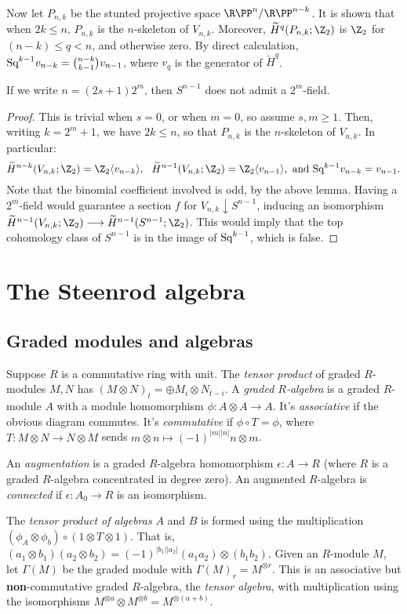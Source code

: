 \documentclass[11pt]{article}
\begin{document}
Now let $P_{n,k}$ be the stunted projective space $\RP^n/\RP^{n-k}$. It is shown that when $2k\leq n$, $P_{n,k}$ is the $n$-skeleton of $V_{n,k}$. Moreover, $\widetilde H^q(P_{n,k};\Z_2)$ is $\Z_2$ for $(n-k)\leq q<n$, and otherwise zero. By direct calculation, $\textup{Sq}^{k-1}v_{n-k}=\binom{n-k}{k-1}v_{n-1}$, where $v_q$ is the generator of $\widetilde H^q$.
\begin{thm*}
If we write $n=(2s+1)2^m$, then $S^{n-1}$ does not admit a $2^m$-field.
\end{thm*}
\begin{proof}
This is trivial when $s=0$, or when $m=0$, so assume $s,m\geq1$. Then, writing $k=2^m+1$, we have $2k\leq n$, so that $P_{n,k}$ is the $n$-skeleton of $V_{n,k}$. In particular: \[\widetilde H^{n-k}(V_{n,k};\Z_2)=\Z_2\langle v_{n-k}\rangle,\ \ \widetilde H^{n-1}(V_{n,k};\Z_2)=\Z_2\langle v_{n-1}\rangle,\text{ and }\Squ^{k-1}v_{n-k}=v_{n-1}.\]
Note that the binomial coefficient involved is odd, by the above lemma.
Having a $2^m$-field would guarantee a section $f$ for $V_{n,k}\downarrow S^{n-1}$, inducing an  isomorphism $\widetilde H^{n-1}(V_{n,k};\Z_2)\to\widetilde H^{n-1}(S^{n-1};\Z_2)$. This would imply that the top cohomology class of $S^{n-1}$ is in the image of $\textup{Sq}^{k-1}$, which is false.
\end{proof}

\section{The Steenrod algebra}
\subsection{Graded modules and algebras}
Suppose $R$ is a commutative ring with unit. The \emph{tensor product} of graded $R$-modules $M,N$ has $(M\otimes N)_t=\oplus M_{i}\otimes N_{t-i}$. A \emph{graded $R$-algebra} is a graded $R$-module $A$ with a module homomorphism $\phi:A\otimes A\to A$. It's \emph{associative} if the obvious diagram commutes. It's \emph{commutative} if $\phi\circ T=\phi$, where $T:M\otimes N\to N\otimes M$ sends $m\otimes n\mapsto (-1)^{|m||n|}n\otimes m$.

An \emph{augmentation} is a graded $R$-algebra homomorphism $\epsilon:A\to R$ (where $R$ is a graded $R$-algebra concentrated in degree zero). An augmented $R$-algebra is \emph{connected} if $\epsilon:A_0\to R$ is an isomorphism.

The \emph{tensor product of algebras} $A$ and $B$ is formed using the multiplication $(\phi_A\otimes\phi_b)\circ(1\otimes T\otimes 1)$. That is, $(a_1\otimes b_1)(a_2\otimes b_2)=(-1)^{|b_1||a_2|}(a_1a_2)\otimes(b_1b_2)$. Given an $R$-module $M$, let $\Gamma(M)$ be the graded module with $\Gamma(M)_r=M^{\otimes r}$. This is an associative but \textbf{non}-commutative graded $R$-algebra, the \emph{tensor algebra}, with multiplication using the isomorphisms $M^{\otimes a}\otimes M^{\otimes b}=M^{\otimes (a+b)}$.
\end{document}
